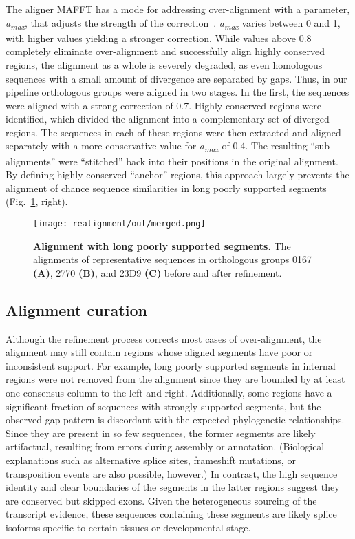 The aligner MAFFT has a mode for addressing over-alignment with a parameter, \textit{a\textsubscript{max}}, that adjusts the strength of the correction~\cite{Katoh2013, Katoh2016}. \textit{a\textsubscript{max}} varies between 0 and 1, with higher values yielding a stronger correction. While values above 0.8 completely eliminate over-alignment and successfully align highly conserved regions, the alignment as a whole is severely degraded, as even homologous sequences with a small amount of divergence are separated by gaps. Thus, in our pipeline orthologous groups were aligned in two stages. In the first, the sequences were aligned with a strong correction of 0.7. Highly conserved regions were identified, which divided the alignment into a complementary set of diverged regions. The sequences in each of these regions were then extracted and aligned separately with a more conservative value for \textit{a\textsubscript{max}} of 0.4. The resulting ``sub-alignments'' were ``stitched'' back into their positions in the original alignment. By defining highly conserved ``anchor'' regions, this approach largely prevents the alignment of chance sequence similarities in long poorly supported segments (Fig.~\ref{fig:realignment}, right).

\begin{figure}[h!]
\texttt{[image: realignment/out/merged.png]}
\centering
\caption{\textbf{Alignment with long poorly supported segments.}
The alignments of representative sequences in orthologous groups 0167 \textbf{(A)}, 2770 \textbf{(B)}, and 23D9 \textbf{(C)} before and after refinement.}
\label{fig:realignment}
\end{figure}

\subsection*{Alignment curation}
Although the refinement process corrects most cases of over-alignment, the alignment may still contain regions whose aligned segments have poor or inconsistent support. For example, long poorly supported segments in internal regions were not removed from the alignment since they are bounded by at least one consensus column to the left and right. Additionally, some regions have a significant fraction of sequences with strongly supported segments, but the observed gap pattern is discordant with the expected phylogenetic relationships. Since they are present in so few sequences, the former segments are likely artifactual, resulting from errors during assembly or annotation. (Biological explanations such as alternative splice sites, frameshift mutations, or transposition events are also possible, however.) In contrast, the high sequence identity and clear boundaries of the segments in the latter regions suggest they are conserved but skipped exons. Given the heterogeneous sourcing of the transcript evidence, these sequences containing these segments are likely splice isoforms specific to certain tissues or developmental stage.

